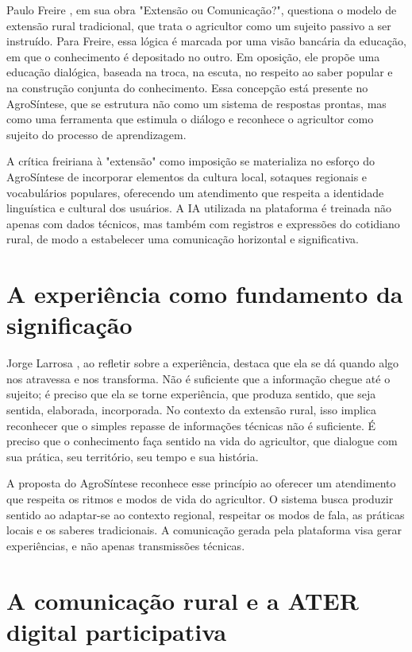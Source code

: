 Paulo Freire \cite{freire2013extensao}, em sua obra "Extensão ou Comunicação?", questiona o modelo de extensão rural tradicional, que trata o agricultor como um sujeito passivo a ser instruído. Para Freire, essa lógica é marcada por uma visão bancária da educação, em que o conhecimento é depositado no outro. Em oposição, ele propõe uma educação dialógica, baseada na troca, na escuta, no respeito ao saber popular e na construção conjunta do conhecimento. Essa concepção está presente no AgroSíntese, que se estrutura não como um sistema de respostas prontas, mas como uma ferramenta que estimula o diálogo e reconhece o agricultor como sujeito do processo de aprendizagem.

A crítica freiriana à "extensão" como imposição se materializa no esforço do AgroSíntese de incorporar elementos da cultura local, sotaques regionais e vocabulários populares, oferecendo um atendimento que respeita a identidade linguística e cultural dos usuários. A IA utilizada na plataforma é treinada não apenas com dados técnicos, mas também com registros e expressões do cotidiano rural, de modo a estabelecer uma comunicação horizontal e significativa.

\section{A experiência como fundamento da significação}

Jorge Larrosa \cite{larrosa2014}, ao refletir sobre a experiência, destaca que ela se dá quando algo nos atravessa e nos transforma. Não é suficiente que a informação chegue até o sujeito; é preciso que ela se torne experiência, que produza sentido, que seja sentida, elaborada, incorporada. No contexto da extensão rural, isso implica reconhecer que o simples repasse de informações técnicas não é suficiente. É preciso que o conhecimento faça sentido na vida do agricultor, que dialogue com sua prática, seu território, seu tempo e sua história.

A proposta do AgroSíntese reconhece esse princípio ao oferecer um atendimento que respeita os ritmos e modos de vida do agricultor. O sistema busca produzir sentido ao adaptar-se ao contexto regional, respeitar os modos de fala, as práticas locais e os saberes tradicionais. A comunicação gerada pela plataforma visa gerar experiências, e não apenas transmissões técnicas.

\section{A comunicação rural e a ATER digital participativa}

